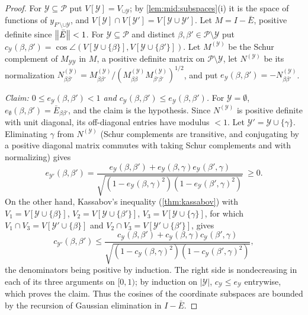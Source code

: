 \begin{proof}
For $\mathcal Y\subseteq\mathcal P$ put $V[\mathcal Y]=V_{\cup\mathcal Y}$; by
\cref{lem:mid:subspaces}(i) it is the space of functions of
$y_{F'\setminus\cup\mathcal Y}$, and $V[\mathcal Y]\cap V[\mathcal
Y']=V[\mathcal Y\cup\mathcal Y']$. Let $M=I-\bar E$, positive definite since
$\left\|\bar E\right\|<1$. For $\mathcal Y\subseteq\mathcal P$ and distinct
$\beta,\beta'\in\mathcal P\setminus\mathcal Y$ put
$c_{\mathcal Y}(\beta,\beta')=\cos\angle(V[\mathcal Y\cup\{\beta\}],V[\mathcal
Y\cup\{\beta'\}])$. Let $M^{(\mathcal Y)}$ be the Schur complement of
$M_{\mathcal Y\mathcal Y}$ in $M$, a positive definite matrix on $\mathcal
P\setminus\mathcal Y$, let $N^{(\mathcal Y)}$ be its normalization
$N^{(\mathcal Y)}_{\beta\beta'}=M^{(\mathcal Y)}_{\beta\beta'}/(M^{(\mathcal
Y)}_{\beta\beta}M^{(\mathcal Y)}_{\beta'\beta'})^{1/2}$, and put $e_{\mathcal
Y}(\beta,\beta')=-N^{(\mathcal Y)}_{\beta\beta'}$.

\emph{Claim: $0\le e_{\mathcal Y}(\beta,\beta')<1$ and $c_{\mathcal
Y}(\beta,\beta')\le e_{\mathcal Y}(\beta,\beta')$.} For $\mathcal Y=\emptyset$,
$e_\emptyset(\beta,\beta')=\bar E_{\beta\beta'}$, and the claim is the
hypothesis. Since $N^{(\mathcal Y)}$ is positive definite with unit diagonal,
its off-diagonal entries have modulus $<1$. Let $\mathcal Y'=\mathcal
Y\cup\{\gamma\}$. Eliminating $\gamma$ from $N^{(\mathcal Y)}$ (Schur
complements are transitive, and conjugating by a positive diagonal matrix
commutes with taking Schur complements and with normalizing) gives
\[
  e_{\mathcal Y'}(\beta,\beta')=\frac{e_{\mathcal Y}(\beta,\beta')+e_{\mathcal
  Y}(\beta,\gamma)e_{\mathcal Y}(\beta',\gamma)}{\sqrt{(1-e_{\mathcal
  Y}(\beta,\gamma)^2)(1-e_{\mathcal Y}(\beta',\gamma)^2)}}\ \ge0 .
\]
On the other hand, Kassabov's inequality (\cref{thm:kassabov}) with
$V_1=V[\mathcal Y\cup\{\beta\}]$, $V_2=V[\mathcal Y\cup\{\beta'\}]$,
$V_3=V[\mathcal Y\cup\{\gamma\}]$, for which $V_1\cap V_3=V[\mathcal
Y'\cup\{\beta\}]$ and $V_2\cap V_3=V[\mathcal Y'\cup\{\beta'\}]$, gives
\[
  c_{\mathcal Y'}(\beta,\beta')\le\frac{c_{\mathcal Y}(\beta,\beta')+c_{\mathcal
  Y}(\beta,\gamma)c_{\mathcal Y}(\beta',\gamma)}{\sqrt{(1-c_{\mathcal
  Y}(\beta,\gamma)^2)(1-c_{\mathcal Y}(\beta',\gamma)^2)}} ,
\]
the denominators being positive by induction. The right side is nondecreasing
in each of its three arguments on $[0,1)$; by induction on $|\mathcal Y|$,
$c_{\mathcal Y}\le e_{\mathcal Y}$ entrywise, which proves the claim. Thus the
cosines of the coordinate subspaces are bounded by the recursion of Gaussian elimination in $I-\bar E$.


\end{proof}
